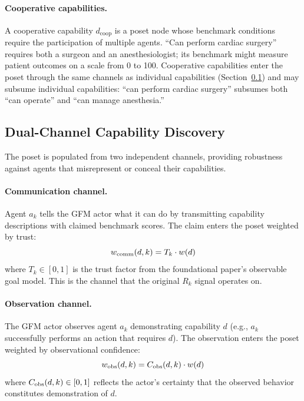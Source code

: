\paragraph{Cooperative capabilities.} A cooperative capability $d_{\mathrm{coop}}$
is a poset node whose benchmark conditions require the participation of
multiple agents. ``Can perform cardiac surgery'' requires both a surgeon and an
anesthesiologist; its benchmark might measure patient outcomes on a scale from
0 to 100. Cooperative capabilities enter the poset through the same channels
as individual capabilities (Section~\ref{sec:dual_channel}) and may subsume
individual capabilities: ``can perform cardiac surgery'' subsumes both ``can
operate'' and ``can manage anesthesia.''


\subsection{Dual-Channel Capability Discovery}
\label{sec:dual_channel}

The poset is populated from two independent channels, providing robustness
against agents that misrepresent or conceal their capabilities.

\paragraph{Communication channel.} Agent $a_k$ tells the GFM actor what it can
do by transmitting capability descriptions with claimed benchmark scores. The
claim enters the poset weighted by trust:
\begin{equation}
\label{eq:w_comm}
w_{\mathrm{comm}}(d, k) = T_k \cdot w(d)
\end{equation}
where $T_k \in [0, 1]$ is the trust factor from the foundational paper's
observable goal model. This is the channel that the original $R_k$ signal
operates on.

\paragraph{Observation channel.} The GFM actor observes agent $a_k$
demonstrating capability $d$ (e.g., $a_k$ successfully performs an action that
requires $d$). The observation enters the poset weighted by observational
confidence:
\begin{equation}
\label{eq:w_obs}
w_{\mathrm{obs}}(d, k) = C_{\mathrm{obs}}(d, k) \cdot w(d)
\end{equation}
where $C_{\mathrm{obs}}(d, k) \in [0, 1]$ reflects the actor's certainty that the
observed behavior constitutes demonstration of $d$.

